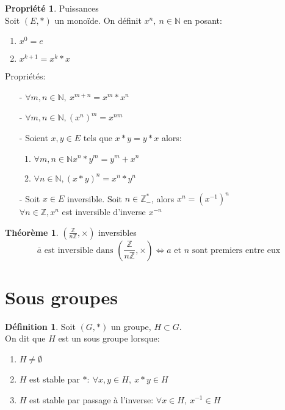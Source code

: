 \documentclass[fleqn]{article}
\theoremstyle{definition} \newtheorem*{defi}{D\'efinition}
\theoremstyle{definition} \newtheorem*{theo}{Th\'eor\`eme}
\theoremstyle{definition} \newtheorem*{coro}{Corollaire}
\theoremstyle{remark} \newtheorem*{rqs}{Remarques}
\theoremstyle{definition} \newtheorem*{prop}{Propri\'et\'e}
\begin{document}
\begin{prop} Puissances \\
Soit $(E, *)$ un mono\"ide. On d\'efinit $x^n,\ n \in \mathbb{N}$ en posant:
	\begin{enumerate}
		\item $x^0 = e$
		\item $x^{k+1} = x^k * x$
	\end{enumerate}
	Propri\'et\'es:
	\begin{itemize}
		\item [-] $\forall m,n \in \mathbb{N},\ x^{m+n} = x^m * x^n$
		\item [-] $\forall m,n \in \mathbb{N}, (x^n)^m = x^{nm}$
		\item [-] Soient $x,y \in E$ tels que $x*y = y*x$ alors:
			\begin{enumerate}
				\item $\forall m,n \in \mathbb{N} x^n * y^m = y^m + x^n$
				\item $\forall n \in \mathbb{N}, (x*y)^n = x^n * y^n$
			\end{enumerate}
		\item [-] Soit $x \in E$ inversible. Soit $n \in \mathbb{Z}_-^*$, alors $x^n = (x^{-1})^n$\\
			$\forall n \in \mathbb{Z}, x^n$ est inversible d'inverse $x^{-n}$
	\end{itemize}
\end{prop}

\begin{theo} $(\frac{\mathbb{Z}}{n\mathbb{Z}}, \times)$ inversibles
\[\overline{a} \text{ est inversible dans } (\frac{\mathbb{Z}}{n\mathbb{Z}}, \times) \Leftrightarrow a \text{ et } n
	\text{ sont premiers entre eux}\]

\end{theo}

\section{Sous groupes}
\begin{defi} Soit $(G,*)$ un groupe, $H \subset G$.\\
	On dit que $H$ est un sous groupe lorsque:
	\begin{enumerate}
		\item $H \neq \emptyset$
		\item $H$ est stable par $*:\ \forall x,y \in H,\ x*y \in H$
		\item $H$ est stable par passage \`a l'inverse: $\forall x \in H,\ x^{-1} \in H$
	\end{enumerate}
\end{defi}
\end{document}
